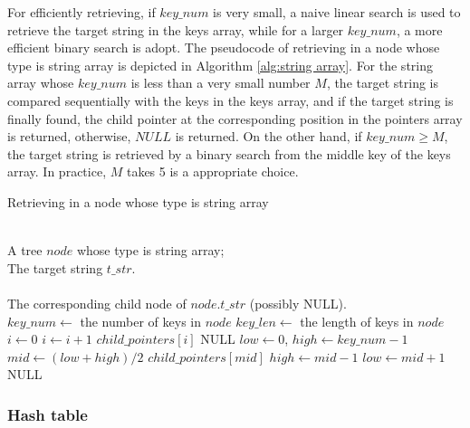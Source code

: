 \documentclass[legalpaper]{article}
\begin{document}
For efficiently retrieving, if $key\_num$ is very small, a naive
linear search is used to retrieve the target string in the keys array,
while for a larger $key\_num$, a more efficient binary search is
adopt.  The pseudocode of retrieving in a node whose type is string
array is depicted in Algorithm \ref{alg:string array}. For the string array
whose $key\_num$ is less than a very small number $M$, the target
string is compared sequentially with the keys in the keys array, and
if the target string is finally found, the child pointer at the
corresponding position in the pointers array is returned, otherwise,
$NULL$ is returned. On the other hand, if $key\_num \geq M$, the
target string is retrieved by a binary search from the middle key of
the keys array. In practice, $M$ takes 5 is a appropriate choice.

\begin{algorithm}
  \caption{Retrieving in a node whose type is string array}
  \label{alg:string array}
  \begin{algorithmic}[1]
    \REQUIRE ~~\\
    A tree $node$ whose type is string array; \\
    The target string $t\_str$.\\
    \ENSURE ~~\\
    The corresponding child node of $node.t\_str$ (possibly NULL).\\
    \STATE
    \STATE $key\_num \leftarrow$ the number of keys in $node$
    \STATE $key\_len \leftarrow$ the length of keys in $node$
    \STATE 
    \STATE $i \leftarrow 0$
    \STATE $i \leftarrow i+1$
    \ENDWHILE
    \RETURN $child\_pointers[i]$
    \ELSE
    \RETURN NULL
    \ENDIF
    \ELSE
    \STATE $low \leftarrow 0$, $high \leftarrow key\_num-1$
    \STATE $mid \leftarrow (low+high)/2$
    \RETURN $child\_pointers[mid]$
    \STATE $high \leftarrow mid - 1$
    \ELSE
    \STATE $low \leftarrow mid + 1$
    \ENDIF
    \ENDWHILE
    \RETURN NULL
    \ENDIF
  \end{algorithmic}
\end{algorithm}

\subsubsection{Hash table}
\label{sec:hash table}
\end{document}
